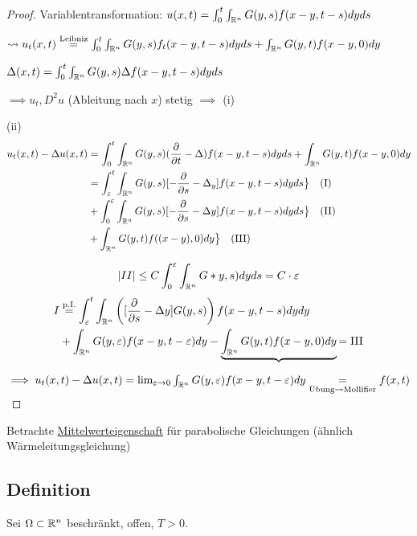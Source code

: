 \begin{proof}
  Variablentransformation:
  $u(x,t) = \int_0^t \int_{\mathbb{R}^n} G(y,s) f(x - y, t - s) dy ds$

  $\leadsto u_t(x,t) \overset{\text{Leibniz}}{=} \int_0^t \int_{\mathbb{R}^n} G(y,s) f_t(x - y, t - s) dy ds + \int_{\mathbb{R}^n} G(y,t) f(x - y, 0) dy$

  $\Delta (x,t) = \int_0^t \int_{\mathbb{R}^n} G(y,s) \Delta f(x - y, t - s) dy ds$

  $\implies u_t, D^2 u$ (Ableitung nach $x$) stetig $\implies$ (i)

  (ii) 
  \begin{align*}
    u_t(x,t) - \Delta u(x,t) 
    &= \int_0^t \int_{\mathbb{R}^n} G(y,s) (\frac{\partial}{\partial t} - \Delta) f(x - y, t - s) dy ds + \int_{\mathbb{R}^n} G(y,t) f(x - y, 0) dy \\
    &= \int_\varepsilon^t \int_{\mathbb{R}^n} G(y,s) [ - \frac{\partial}{\partial s} - \Delta_y] f(x - y, t - s) dy ds \big\} \quad\text{(I)} \\
    &+ \int_0^\varepsilon \int_{\mathbb{R}^n} G(y,s) [-\frac{\partial}{\partial s} - \Delta y] f(x - y, t - s) dy ds \big\} \quad\text{(II)} \\
    &+ \int_{\mathbb{R}^n} G(y,t) f((x-y), 0) dy \big\} \quad\text{(III)}
  \end{align*}

  $$
  |II| \leq C \int_0^\varepsilon \int_{\mathbb{R}^n} G*y,s) dy ds = C \cdot \varepsilon
  $$
  \begin{align*}
  I &\overset{\text{p.I.}}{=} \int_\varepsilon^t \int_{\mathbb{R}^n} \left( [ \frac{\partial}{\partial s} - \Delta y] G(y, s)\right) f(x - y, t- s) dy dy \\
                          &+ \int_{\mathbb{R}^n} G(y,\varepsilon) f(x-y, t-\varepsilon) dy - \underbrace{\int_{\mathbb{R}^n} G(y,t) f(x - y, 0) dy}{= \text{III}}
  \end{align*}

  $\implies u_t(x,t) - \Delta u(x,t) = \lim_{\varepsilon \to 0} \int_{\mathbb{R}^n} G(y, \varepsilon) f(x - y, t - \varepsilon) dy \underset{\text{Übung}\leadsto\text{Mollifier}}{=} f(x,t)$
\end{proof}

Betrachte \underline{Mittelwerteigenschaft} für parabolische Gleichungen (ähnlich Wärmeleitungsgleichung)

\subsection{Definition}

Sei $\Omega \subset \mathbb{R}^n$ beschränkt, offen, $T>0$.


